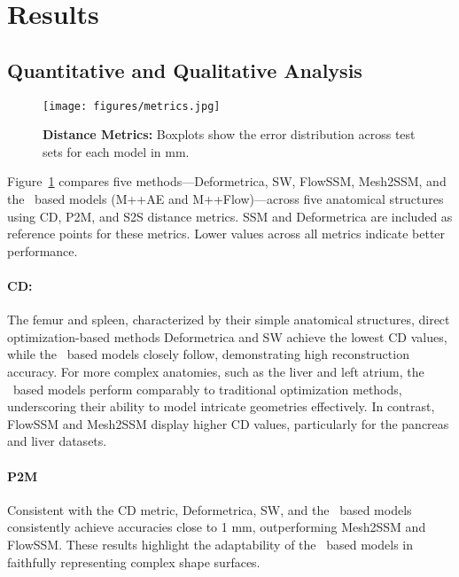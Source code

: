 



\section{Results}
\subsection{Quantitative and Qualitative Analysis}
\begin{figure}
    \centering
    \texttt{[image: figures/metrics.jpg]}
    \caption{\textbf{Distance Metrics:} Boxplots show the error distribution across test sets for each model in mm. } 
    \label{fig:distance_metrics}
\end{figure}

Figure~\ref{fig:distance_metrics} compares five methods—Deformetrica, SW, FlowSSM, Mesh2SSM, and the \model~based models (M++AE and M++Flow)—across five anatomical structures using CD, P2M, and S2S distance metrics. SSM and Deformetrica are included as reference points for these metrics. Lower values across all metrics indicate better performance.

\paragraph{CD:} The femur and spleen, characterized by their simple anatomical structures, direct optimization-based methods Deformetrica and SW achieve the lowest CD values, while the \model~based models closely follow, demonstrating high reconstruction accuracy. For more complex anatomies, such as the liver and left atrium, the \model~based models perform comparably to traditional optimization methods, underscoring their ability to model intricate geometries effectively. In contrast, FlowSSM and Mesh2SSM display higher CD values, particularly for the pancreas and liver datasets.

\paragraph{P2M} Consistent with the CD metric, Deformetrica, SW, and the \model~based models consistently achieve accuracies close to 1 mm, outperforming Mesh2SSM and FlowSSM. These results highlight the adaptability of the \model~based models in faithfully representing complex shape surfaces.

